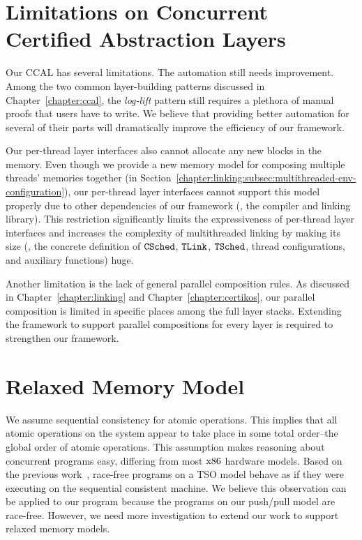 \section{Limitations on Concurrent Certified Abstraction Layers}

Our CCAL has several limitations.
The automation still needs improvement. Among the two common layer-building patterns discussed in 
Chapter~\ref{chapter:ccal},
the \textit{log-lift} pattern still requires a plethora of manual proofs that users have to write. 
We believe that providing better automation for several of their parts will dramatically improve the efficiency of our framework.

Our per-thread layer interfaces also cannot allocate any new blocks in the memory. Even though we provide a new memory 
model for composing multiple threads’ memories together 
(in  Section~\ref{chapter:linking:subsec:multithreaded-env-configuration}),
our per-thread layer interfaces cannot support this model properly due to other dependencies of our framework 
(\ie, the compiler and linking library). This restriction significantly limits the expressiveness of per-thread layer interfaces 
and increases the complexity of multithreaded linking by making its size  (\ie, the concrete definition of 
${{\mathrm{\texttt{CSched}}}}$, ${{\mathrm{\texttt{TLink}}}}$, ${{\mathrm{\texttt{TSched}}}}$,  thread configurations, and auxiliary functions) huge. 

Another limitation is the lack of general parallel composition rules. As discussed in Chapter~\ref{chapter:linking} and Chapter~\ref{chapter:certikos}, 
our parallel composition is limited in specific places among the full layer stacks. Extending the framework to support 
parallel compositions for every layer is required to strengthen our framework.

\section{Relaxed Memory Model}

We assume sequential consistency for atomic operations. 
This implies that all atomic operations on the system appear to take place in some total order--the global order of atomic operations.
This assumption makes reasoning about concurrent programs easy, differing from most $\mathrm{x86}$
 hardware models. Based on the previous work~\cite{sevcik13}, 
race-free programs on a TSO model behave as if they were executing on the sequential consistent machine. 
We believe this observation can be applied to our program because the programs on our push/pull model are race-free. 
However, we need more investigation to extend our work to support relaxed memory models.


